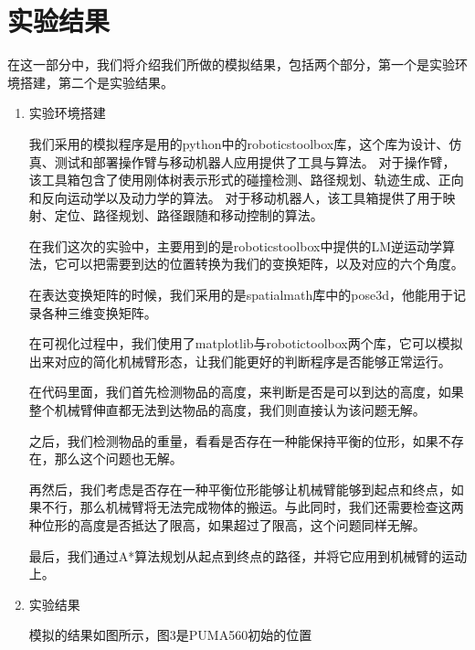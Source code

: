 \documentclass[conference]{IEEEtran}
\begin{document}
\section{实验结果}
在这一部分中，我们将介绍我们所做的模拟结果，包括两个部分，第一个是实验环境搭建，第二个是实验结果。
\begin{enumerate}
    \item 实验环境搭建
    
    我们采用的模拟程序是用的python中的roboticstoolbox库，这个库为设计、仿真、测试和部署操作臂与移动机器人应用提供了工具与算法。
    对于操作臂，该工具箱包含了使用刚体树表示形式的碰撞检测、路径规划、轨迹生成、正向和反向运动学以及动力学的算法。
    对于移动机器人，该工具箱提供了用于映射、定位、路径规划、路径跟随和移动控制的算法。

    在我们这次的实验中，主要用到的是roboticstoolbox中提供的LM逆运动学算法，它可以把需要到达的位置转换为我们的变换矩阵，以及对应的六个角度。

    在表达变换矩阵的时候，我们采用的是spatialmath库中的pose3d，他能用于记录各种三维变换矩阵。

    在可视化过程中，我们使用了matplotlib与robotictoolbox两个库，它可以模拟出来对应的简化机械臂形态，让我们能更好的判断程序是否能够正常运行。

    在代码里面，我们首先检测物品的高度，来判断是否是可以到达的高度，如果整个机械臂伸直都无法到达物品的高度，我们则直接认为该问题无解。

    之后，我们检测物品的重量，看看是否存在一种能保持平衡的位形，如果不存在，那么这个问题也无解。

    再然后，我们考虑是否存在一种平衡位形能够让机械臂能够到起点和终点，如果不行，那么机械臂将无法完成物体的搬运。与此同时，我们还需要检查这两种位形的高度是否抵达了限高，如果超过了限高，这个问题同样无解。

    最后，我们通过A*算法规划从起点到终点的路径，并将它应用到机械臂的运动上。

    \item 实验结果
    
    模拟的结果如图所示，图3是PUMA560初始的位置


\end{enumerate}
\end{document}
